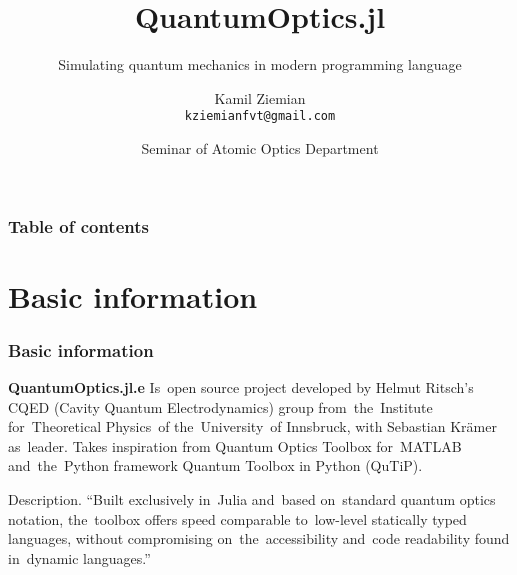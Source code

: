 \documentclass[10pt,t]{beamer}
\title{QuantumOptics.jl}
\subtitle{Simulating quantum mechanics in modern programming language}
\author{Kamil Ziemian \\
  \texttt{kziemianfvt@gmail.com}}
\institute{Field Theory Department, Jagiellonian University in~Cracow}
\date[4 March 2019]{Seminar of Atomic Optics Department}
\begin{document}






\RaggedRight





\maketitle %





\begin{frame}
  \frametitle{Table of contents}


  \tableofcontents %

\end{frame}










\section{Basic information}



\begin{frame}
  \frametitle{Basic information}


  \textbf{QuantumOptics.jl.e}
  Is~open source project developed by Helmut Ritsch's CQED (Cavity
  Quantum Electrodynamics) group from~the~Institute for~Theoretical
  Physics~of the~University~of Innsbruck, with Sebastian Kr\"{a}mer
  as~leader. Takes inspiration from Quantum Optics Toolbox
  for~MATLAB and~the~Python framework Quantum Toolbox in Python
  (QuTiP).

  Description.
  ``Built exclusively in~Julia and~based on~standard quantum optics
  notation, the~toolbox offers speed comparable to~low-level
  statically typed languages, without compromising
  on~the~accessibility and~code readability found in~dynamic
  languages.''

\end{frame}
\end{document}
